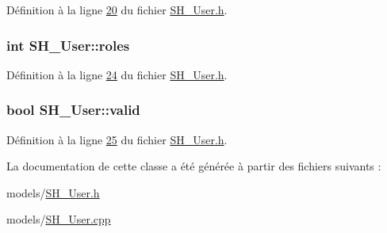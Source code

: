Définition à la ligne \hyperlink{SH__User_8h_source_l00020}{20} du fichier \hyperlink{SH__User_8h_source}{S\-H\-\_\-\-User.\-h}.

\hypertarget{classSH__User_a4ccfdedef6ae4f0cf0345a7bfa306e9c}{
\subsubsection[{roles}]{\setlength{\rightskip}{0pt plus 5cm}int S\-H\-\_\-\-User\-::roles\hspace{0.3cm}{\ttfamily [read]}}}\label{classSH__User_a4ccfdedef6ae4f0cf0345a7bfa306e9c}


Définition à la ligne \hyperlink{SH__User_8h_source_l00024}{24} du fichier \hyperlink{SH__User_8h_source}{S\-H\-\_\-\-User.\-h}.

\hypertarget{classSH__User_a91cae1175894bf2eef629405638db01c}{
\subsubsection[{valid}]{\setlength{\rightskip}{0pt plus 5cm}bool S\-H\-\_\-\-User\-::valid\hspace{0.3cm}{\ttfamily [read]}}}\label{classSH__User_a91cae1175894bf2eef629405638db01c}


Définition à la ligne \hyperlink{SH__User_8h_source_l00025}{25} du fichier \hyperlink{SH__User_8h_source}{S\-H\-\_\-\-User.\-h}.



La documentation de cette classe a été générée à partir des fichiers suivants \-:\begin{DoxyCompactItemize}
\item 
models/\hyperlink{SH__User_8h}{S\-H\-\_\-\-User.\-h}\item 
models/\hyperlink{SH__User_8cpp}{S\-H\-\_\-\-User.\-cpp}\end{DoxyCompactItemize}
